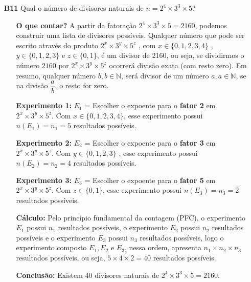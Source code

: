 \documentclass[a4paper,12pt]{article}
\begin{document}
\begin{enumerate}
\newpage
  
\item[\textbf{B11}] Qual o número de divisores naturais de $n = 2^4 \times 3^3 \times 5$?
  \begin{itemize}
    \item[\ding{172}] \textbf{O que contar?} A partir da fatoração $ 2^4 \times 3^3 \times 5 = 2160 $, podemos construir uma lista de divisores possíveis. Qualquer número que pode ser escrito através do produto $2^x \times 3^y \times 5^z$ , com $x \in \{0,1,2,3,4\}$ , $y \in \{0,1,2,3\}$ e $z \in \{0,1\}$, é um divisor de 2160, ou seja, se dividirmos o número $2160 \textrm{ por } 2^x \times 3^y \times 5^z$ ocorrerá divisão exata (com resto zero). Em resumo, qualquer número $b, b \in \mathbb{N}$, será divisor de um número $a, a \in \mathbb{N}$, se na divisão $\dfrac{a}{b}$, o resto for zero.
    \item[\ding{173}] \textbf{Experimento 1:} $E_1$ = Escolher o expoente para o \textbf{fator 2} em $2^x \times 3^y \times 5^z$. Com $x \in \{0,1,2,3,4\}$, esse experimento possui $n(E_1) = n_1 = 5$ resultados possíveis.
    \item[\ding{174}] \textbf{Experimento 2:} $E_2$ = Escolher o expoente para o \textbf{fator 3} em $2^x \times 3^y \times 5^z$. Com $y \in \{0,1,2,3\}$ , esse experimento possui $n(E_2) = n_2 = 4$ resultados possíveis.
    \item[\ding{175}] \textbf{Experimento 3:} $E_3$ = Escolher o expoente para o \textbf{fator 5} em $2^x \times 3^y \times 5^z$. Com $z \in \{0,1\}$, esse experimento possui $n(E_3) = n_3 = 2$ resultados possíveis.
    \item[\ding{176}] \textbf{Cálculo:} Pelo princípio fundamental da contagem (PFC), o experimento $E_1$ possui $n_1$ resultados possíveis, o experimento $E_2$ possui $n_2$ resultados possíveis e o experimento $E_3$ possui $n_3$ resultados possíveis, logo o experimento composto $E_1, E_2 \textrm{ e } E_3$, nessa ordem, apresenta $n_1 \times n_2 \times n_3$ resultados possíveis, ou seja, $5 \times 4 \times 2 = 40$ resultados possíveis.
    \item[\ding{177}] \textbf{Conclusão:} Existem 40 divisores naturais de $ 2^4 \times 3^3 \times 5 = 2160$.  
  \end{itemize}    
  


\end{enumerate}
\end{document}
